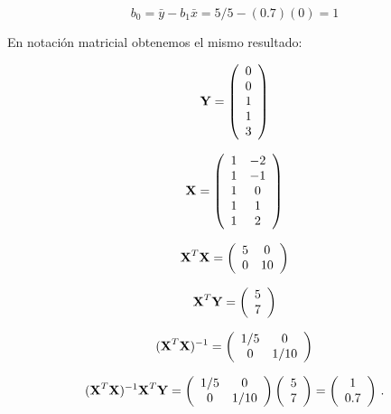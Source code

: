\documentclass[
]{agujournal2019}
\begin{document}
\[b_0=\bar{y}-b_1\bar{x}=5/5-(0.7)(0)=1\]

En notación matricial obtenemos el mismo resultado:

\[{\textbf Y}=\left(\begin{array}{c}
  0 \\ 0 \\ 1 \\ 1 \\ 3\\
        \end{array}\right)\]

\[{\textbf X}=\left(\begin{array}{cc}
  1 & -2 \\
  1 & -1 \\
  1 & 0 \\
  1 & 1 \\
  1 & 2\\
        \end{array}\right)\]

\[{\textbf X}^T{\textbf X}= \left(\begin{array}{ccccc}
   5 &  0 \\
  0 & 10 \\
        \end{array}\right)\]

\[{\textbf X}^T{\textbf Y}= \left(\begin{array}{ccccc}
   5  \\
  7  \\
        \end{array}\right)\]

\[({\textbf X}^T{\textbf X})^{-1}= \left(\begin{array}{ccccc}
   1/5 &  0 \\
   0 & 1/10 \\
        \end{array}\right)\]

\[ ({\textbf X}^T{\textbf X})^{-1}{\textbf X}^T{\textbf Y}=
    \left(\begin{array}{ccccc}
   1/5 &  0 \\
   0 & 1/10 \\
        \end{array}\right)\left(\begin{array}{ccccc}
   5  \\
  7  \\
        \end{array}\right)=
    \left(\begin{array}{ccccc}
   1  \\
  0.7  \\
        \end{array}\right)\,.\]
\end{document}
